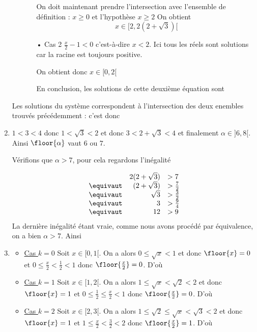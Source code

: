 \begin{correction}
\begin{enumerate}
\begin{itemize}
\begin{itemize}
On doit maintenant prendre l'intersection avec l'ensemble de définition : $x\geq 0$ et l'hypothèse $x\geq 2$ 
On obtient 
$$x\in [2,2(2+\sqrt{3})[$$



\item[•] Cas 2 $\frac{x}{2}-1< 0$ c'est-à-dire $x< 2$.   Ici tous les réels sont solutions car la racine est toujours positive. 

On obtient donc $x\in [0,2[$

En conclusion, les solutions de cette deuxième équation sont 
\conclusion{  $[0,2(2+\sqrt{3})[$}

\end{itemize}
\end{itemize}

Les solutions du système correspondent à l'intersection des deux enembles trouvés précédemment : c'est donc 
\conclusion{  $[0,2(2+\sqrt{3})[$}


\item $1<3< 4$ donc $1<\sqrt{3}<2$ et donc 
$3<2+\sqrt{3}<4$ et finalement $\alpha \in ]6, 8[$.
Ainsi $\floor{\alpha  }$ vaut $6$ ou $7$. 

Vérifions que $\alpha >7$, pour cela regardons l'inégalité 

$$\begin{array}{lrl}
&2(2+\sqrt{3})&>7\\
\equivaut &(2+\sqrt{3})&>\frac{7}{2}\\
\equivaut &\sqrt{3} &>\frac{3}{2}\\
\equivaut &3&>\frac{9}{4}\\
\equivaut & 12&>9
\end{array}$$
La dernière inégalité étant vraie, comme nous avons procédé par équivalence, on a bien $\alpha >7$. 
Ainsi 

\item \begin{itemize}
\item \underline{Cas $k=0$}
Soit $x\in [0,1[$. On a alors $0\leq \sqrt{x}<1$ et donc $\floor{x}=0$ et $0\leq \frac{x}{2}<\frac{1}{2}<1$ donc 
$\floor{\frac{x}{2}} =0$. D'où 
\conclusion{
$\forall x\in [0,1[\,\quad  \floor{\sqrt{x}} = \floor{ \frac{x}{2}}$
}
\item \underline{Cas $k=1$}
Soit $x\in [1,2[$. On a alors $1\leq \sqrt{x}<\sqrt{2}<2$ et donc $\floor{x}=1$ et $0\leq \frac{1}{2}\leq \frac{x}{2}<1$ donc 
$\floor{\frac{x}{2}} =0$. D'où 
\conclusion{
$\forall x\in [1,2[\,\quad  \floor{\sqrt{x}} \neq  \floor{ \frac{x}{2}}$
}
\item \underline{Cas $k=2$}
Soit $x\in [2,3[$. On a alors $1\leq \sqrt{2}\leq\sqrt{x}<\sqrt{3}<2$ et donc $\floor{x}=1$ et $1\leq \frac{x}{2}<\frac{3}{2}<2$ donc 
$\floor{\frac{x}{2}} =1$. D'où 
\conclusion{
$\forall x\in [2,3[\,\quad  \floor{\sqrt{x}} =  \floor{ \frac{x}{2}}$
}



\end{itemize}
\end{enumerate}
\end{correction}
